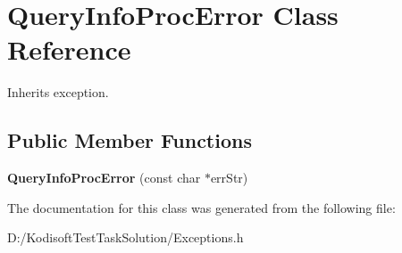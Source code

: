 \hypertarget{class_query_info_proc_error}{\section{Query\+Info\+Proc\+Error Class Reference}
\label{class_query_info_proc_error}
}


Inherits exception.

\subsection*{Public Member Functions}
\begin{DoxyCompactItemize}
\item 
\hypertarget{class_query_info_proc_error_a5dab6f56e04e073e441d05ab826c5947}{{\bfseries Query\+Info\+Proc\+Error} (const char $\ast$err\+Str)}\label{class_query_info_proc_error_a5dab6f56e04e073e441d05ab826c5947}

\end{DoxyCompactItemize}


The documentation for this class was generated from the following file\+:\begin{DoxyCompactItemize}
\item 
D\+:/\+Kodisoft\+Test\+Task\+Solution/Exceptions.\+h\end{DoxyCompactItemize}
